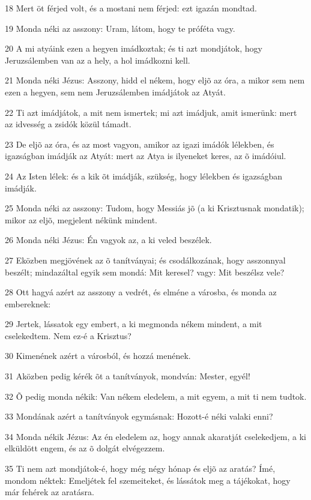 \par 18 Mert öt férjed volt, és a mostani nem férjed: ezt igazán mondtad.
\par 19 Monda néki az asszony: Uram, látom, hogy te próféta vagy.
\par 20 A mi atyáink ezen a hegyen imádkoztak; és ti azt mondjátok, hogy Jeruzsálemben van az a hely, a hol imádkozni kell.
\par 21 Monda néki Jézus: Asszony, hidd el nékem, hogy eljõ az óra, a mikor sem nem ezen a hegyen, sem nem Jeruzsálemben imádjátok az Atyát.
\par 22 Ti azt imádjátok, a mit nem ismertek; mi azt imádjuk, amit ismerünk: mert az idvesség  a zsidók közül támadt.
\par 23 De eljõ az óra, és az most vagyon, amikor az igazi imádók lélekben, és igazságban imádják az Atyát: mert az Atya is ilyeneket keres, az õ imádóiul.
\par 24 Az Isten lélek: és a kik õt imádják, szükség, hogy lélekben és igazságban imádják.
\par 25 Monda néki az asszony: Tudom, hogy Messiás jõ (a ki Krisztusnak mondatik); mikor az eljõ, megjelent nékünk mindent.
\par 26 Monda néki Jézus: Én vagyok az, a ki veled beszélek.
\par 27 Eközben megjövének az õ tanítványai; és csodálkozának, hogy asszonnyal beszélt; mindazáltal egyik sem mondá: Mit keresel? vagy: Mit beszélsz vele?
\par 28 Ott hagyá azért az asszony a vedrét, és elméne a városba, és monda az embereknek:
\par 29 Jertek, lássatok egy embert, a ki megmonda nékem mindent, a mit cselekedtem. Nem ez-é a Krisztus?
\par 30 Kimenének azért a városból, és hozzá menének.
\par 31 Aközben pedig kérék õt a tanítványok, mondván: Mester, egyél!
\par 32 Õ pedig monda nékik: Van nékem eledelem, a mit egyem, a mit ti nem tudtok.
\par 33 Mondának azért a tanítványok egymásnak: Hozott-é néki valaki enni?
\par 34 Monda nékik Jézus: Az én eledelem az, hogy annak akaratját cselekedjem, a ki elküldött engem, és az õ dolgát elvégezzem.
\par 35 Ti nem azt mondjátok-é, hogy még négy hónap és eljõ az aratás? Ímé, mondom néktek: Emeljétek fel szemeiteket, és lássátok meg a tájékokat, hogy már fehérek az aratásra.
